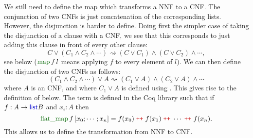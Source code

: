 \documentclass{article}
\begin{document}
We still need to define the map which transforms a NNF to a CNF. The conjunction of two CNFs is just concatenation of the corresponding lists. However, the disjunction is harder to define. Doing first the simpler case of taking the disjunction of a clause with a CNF, we see that this corresponds to just adding this clause in front of every other clause:
$$C\vee(C_1\wedge C_2\wedge\cdots)\rightsquigarrow (C\vee C_1)\wedge(C\vee C_2)\wedge\cdots,$$
see  below ($\coqdocdefinition{map}\,f\,l$ means applying $f$ to every element of $l$). We can then define the disjunction of two CNFs as follows:
$$(C_1\wedge C_2\wedge\cdots)\vee A\rightsquigarrow (C_1\vee A)\wedge (C_2\vee A)\wedge\cdots$$
where $A$ is an CNF, and where $C_1\vee A$ is defined using . This gives rise to the definition of  below. The term  is defined in the Coq library such that if $f:A\to\coqdocinductive{list} B$ and $x_i:A$ then
$$\coqdocdefinition{flat\_map}\,f\,[x_0; \cdots;x_n] = f (x_0)\;\coqdocnotation{++}\; f(x_1)\;\coqdocnotation{++}\;\cdots\; \coqdocnotation{++}\;f(x_n).$$
This allows us to define the transformation from NNF to CNF.
\end{document}
